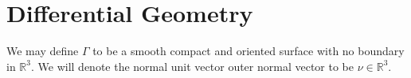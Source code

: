 

\newpage
\section{Differential Geometry}%
\label{sec:differential_geometry}

We may define $\Gamma$ to be a smooth compact and oriented surface with no boundary in $\mathbb{R} ^{3}$. We will denote the normal unit vector outer normal vector to be  $ \nu \in \mathbb{R} ^{3}$.




